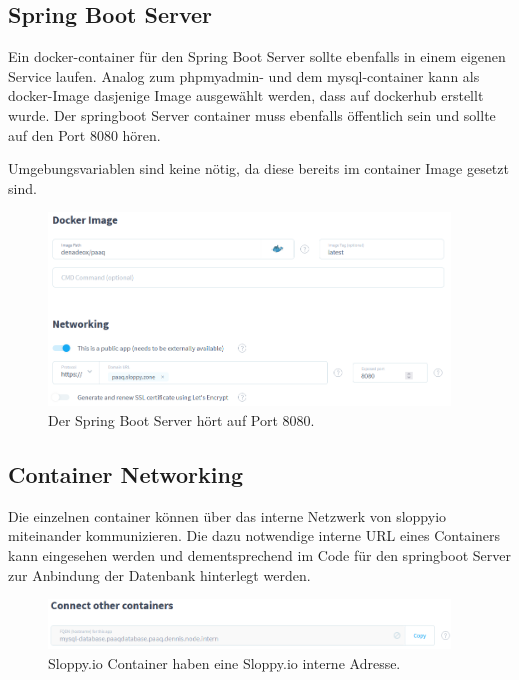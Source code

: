 \documentclass[../main.tex]{subfiles}
\begin{document}
	\subsection{Spring Boot Server}
	\par Ein \gls{docker}-\gls{container} für den Spring Boot Server sollte ebenfalls in einem eigenen Service laufen. Analog zum \gls{phpmyadmin}- und dem \gls{mysql}-\gls{container} kann als \gls{docker}-Image dasjenige Image ausgewählt werden, dass auf \gls{dockerhub} erstellt wurde. Der \gls{springboot} Server \gls{container} muss ebenfalls öffentlich sein und sollte auf den Port 8080 hören.
	\par \noindent Umgebungsvariablen sind keine nötig, da diese bereits im \gls{container} Image gesetzt sind.
	
	\begin{figure}[H]
		\centering
		\includegraphics[width=0.95\textwidth]{../images/SloppySpringServer} 
		\caption{Der Spring Boot Server hört auf Port 8080.}
		\label{fig:SloppySpringServer}
	\end{figure}
	
	\subsection{Container Networking}
	\par Die einzelnen \gls{container} können über das interne Netzwerk von \gls{sloppyio} miteinander kommunizieren. Die dazu notwendige interne URL eines Containers kann eingesehen werden und dementsprechend im Code für den \gls{springboot} Server zur Anbindung der Datenbank hinterlegt werden.
	\begin{figure}[H]
		\centering
		\includegraphics[width=0.95\textwidth]{../images/SloppyConnectContainers} 
		\caption{Sloppy.io Container haben eine Sloppy.io interne Adresse.}
		\label{fig:SloppyConnectContainers}
	\end{figure}
	
\end{document}
